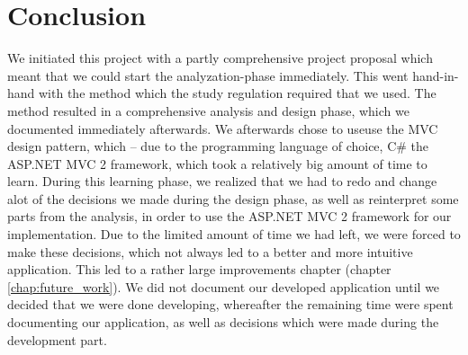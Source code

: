 \chapter{Conclusion}
\label{chap:conclusion}
We initiated this project with a partly comprehensive project proposal which meant that we could start the analyzation-phase immediately. This went hand-in-hand with the \ooad{} method which the study regulation required that we used. The \ooad{} method resulted in a comprehensive analysis and design phase, which we documented immediately afterwards. We afterwards chose to useuse the MVC design pattern, which -- due to the programming language of choice, C\# the ASP.NET MVC 2 framework, which took a relatively big amount of time to learn. During this learning phase, we realized that we had to redo and change alot of the decisions we made during the design phase, as well as reinterpret some parts from the analysis, in order to use the ASP.NET MVC 2 framework for our implementation. Due to the limited amount of time we had left, we were forced to make these decisions, which not always led to a better and more intuitive application. This led to a rather large improvements chapter (chapter \ref{chap:future_work}). We did not document our developed application until we decided that we were done developing, whereafter the remaining time were spent documenting our application, as well as decisions which were made during the development part.








